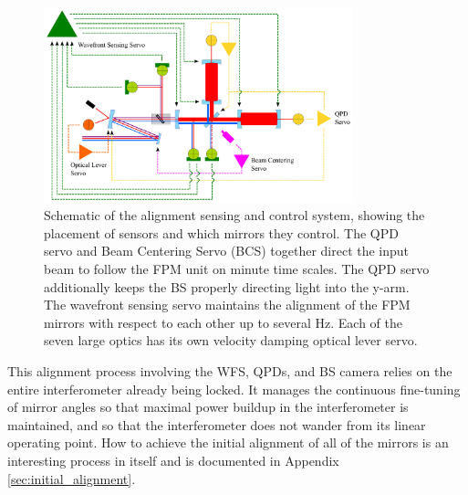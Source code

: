 \begin{figure} \begin{centering} \includegraphics[width=0.8\textwidth]{figures/ASClayout_wctrl.pdf} 
\caption{Schematic of the alignment sensing and control system, showing the placement of sensors and which mirrors they control. The QPD servo and Beam Centering Servo (BCS) together direct the input beam to follow the FPM unit on minute time scales. The QPD servo additionally keeps the BS properly directing light into the y-arm. The wavefront sensing servo maintains the alignment of the FPM mirrors with respect to each other up to several Hz. Each of the seven large optics has its own velocity damping optical lever servo.}
\label{fig:ASClayout}
\end{centering}
\end{figure}

This alignment process involving the WFS, QPDs, and BS camera relies on the entire interferometer already being locked. It manages the continuous fine-tuning of mirror angles so that maximal power buildup in the interferometer is maintained, and so that the interferometer does not wander from its linear operating point. How to achieve the initial alignment of all of the mirrors is an interesting process in itself and is documented in Appendix \ref{sec:initial_alignment}.


